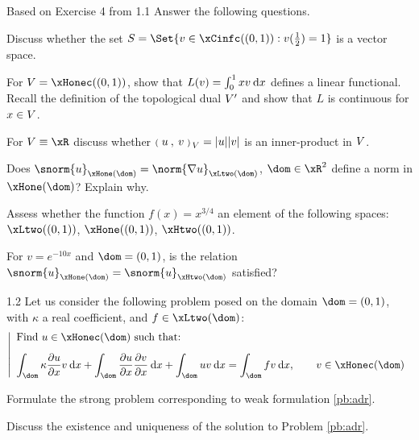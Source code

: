 \begin{tmaxrcs}{Based on Exercise 4 from \cite{MIT}}{1.1}
Answer the following questions.

\begin{tmatsks}
\item Discuss whether the set $S = \Set{ v \in \xCinfc((0,1)) : v(\frac{1}{2}) = 1 }$ is a vector space.
\item For $\xV = \xHonec((0,1))$, show that $L(v) =\int_0^1 xv \hspace{.5ex}{\mathrm d} x$ defines a linear functional. Recall the definition of the topological dual ${V}'$ and show that $L$ is continuous for $x \in {V}$.
\item For $\xV \equiv \xR$ discuss whether ${{\scriptstyle\mathbf{(}}\;u\:,\: v \;{\scriptstyle\mathbf{)}}}_{\,{V}} = |u| |v|$ is an inner-product in ${V}$.
\item Does $\snorm{u}_{\xHone(\dom)} = \norm{\nabla u}_{\xLtwo(\dom)}$, $\dom\in\xR^2$ define a norm in $\xHone(\dom)$? Explain why.
\item Assess whether the function $f(x) = x^{3/4}$ an element of the following spaces: $\xLtwo((0,1))$, $\xHone((0,1))$, $\xHtwo((0,1))$.
\item For $v = e^{-10x}$ and $\dom = (0,1)$, is the relation $\snorm{u}_{\xHone(\dom)} = \snorm{u}_{\xHtwo(\dom)}$ satisfied?
\end{tmatsks}
\end{tmaxrcs}

\begin{tmaxrcs}{}{1.2}
Let us consider the following problem posed on the domain $\dom = (0, 1)$, with $\kappa$ a real coefficient, and $f\in\xLtwo(\dom)$:
\begin{equation}\label{pb:adr}
\left\lvert
\begin{array}{ll}
\mbox{Find $u \in \xHonec(\dom)$ such that:}\\[2ex]
\displaystyle \int_\dom \kappa \pddx{u} v \dx + \int_\dom \pddx{u} \pddx{v} \dx + \int_\dom u v \dx = \int_\dom f v \dx, \qquad v \in \xHonec(\dom)
\end{array}
\right .
\end{equation}
\begin{tmatsks}
\item Formulate the strong problem corresponding to weak formulation \eqref{pb:adr}.
\item Discuss the existence and uniqueness of the solution to Problem \eqref{pb:adr}.
\end{tmatsks}
\end{tmaxrcs}

